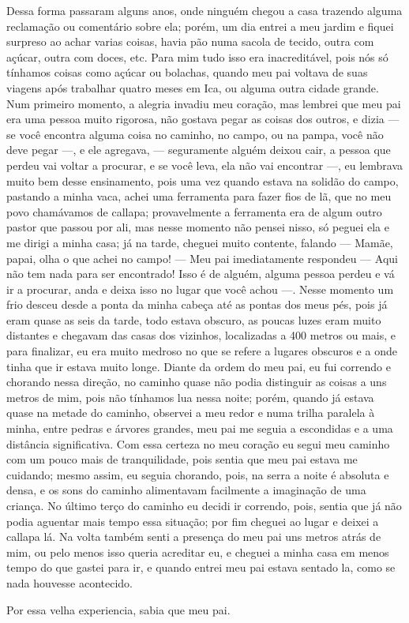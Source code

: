 Dessa forma passaram alguns anos, onde ninguém chegou a casa trazendo alguma reclamação ou comentário sobre ela; porém, um dia entrei a meu jardim e fiquei surpreso ao achar varias coisas, havia pão numa sacola de tecido, outra com açúcar, outra com doces, etc. 
Para mim tudo isso era inacreditável, pois nós só tínhamos coisas como açúcar ou bolachas, quando meu pai voltava de suas viagens após trabalhar quatro meses em Ica, ou alguma outra cidade grande.
Num primeiro momento, a alegria invadiu meu coração, mas lembrei que meu pai era uma pessoa muito rigorosa, não gostava pegar as coisas dos outros, e dizia --- se você encontra alguma coisa no caminho, no campo, ou na pampa, você não deve pegar ---, e ele agregava, --- seguramente alguém deixou cair, a pessoa que perdeu vai voltar a procurar, e se você leva, ela não vai encontrar ---, 
eu lembrava muito bem desse ensinamento, pois uma vez quando estava na solidão do campo, pastando a minha vaca, achei uma ferramenta para fazer fios de lã, que no meu povo chamávamos de callapa; provavelmente a ferramenta era de algum outro pastor que passou por ali, mas nesse momento não pensei nisso, só peguei ela e me dirigi a minha casa; já na tarde, cheguei  muito contente, falando --- Mamãe, papai, olha o que achei no campo! --- 
Meu pai imediatamente respondeu --- Aqui não tem nada para ser encontrado! Isso é de alguém, alguma pessoa perdeu e vá ir a procurar, anda e deixa isso no lugar que você achou ---. 
Nesse momento um frio desceu desde a ponta da minha cabeça até as pontas dos meus pés, pois já eram quase as seis da tarde, todo estava obscuro, as poucas luzes eram muito distantes e chegavam das casas dos vizinhos, localizadas a 400 metros ou mais, e para finalizar, eu era muito medroso no que se refere a lugares obscuros e a onde tinha que ir estava muito longe.
Diante da ordem do meu pai, eu fui correndo e chorando nessa direção, no caminho quase não podia distinguir as coisas a uns metros de mim, pois não tínhamos lua nessa noite; porém, quando já estava quase na metade do caminho, observei a meu redor e numa trilha paralela à minha, entre pedras e árvores grandes, meu pai me seguia a escondidas e a uma distância significativa.
Com essa certeza no meu coração eu segui meu caminho com um pouco mais de tranquilidade, pois sentia que meu pai estava me cuidando; mesmo assim, eu seguia chorando, pois, na serra a noite é absoluta e densa, e os sons do caminho alimentavam facilmente a imaginação de uma criança.
No último terço do caminho eu decidi ir correndo, pois, sentia que já não podia aguentar mais tempo essa situação; por fim cheguei ao lugar e deixei a callapa lá.
Na volta também senti a presença do meu pai uns metros atrás de mim, ou pelo menos isso queria acreditar eu, e cheguei a minha casa em menos tempo do que gastei para ir, e quando entrei meu pai estava sentado la, como se nada houvesse acontecido.

Por essa velha experiencia, sabia que meu pai.



